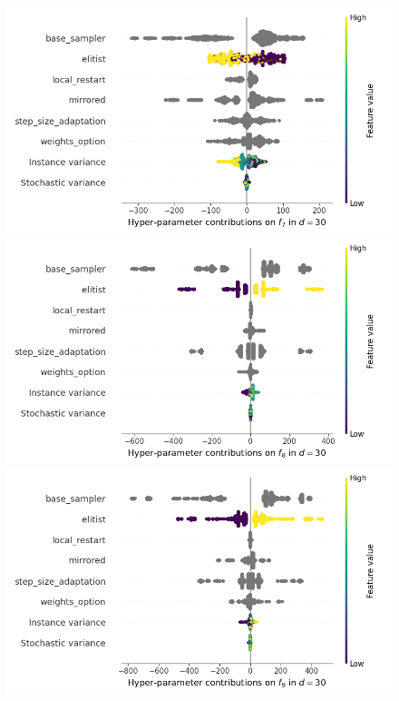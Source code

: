 \begin{figure}[t]
	\includegraphics[height=0.15\textheight,trim=60mm 0mm 30mm 0mm,clip]{images/img_summary_f7_d30.png}
	\includegraphics[height=0.15\textheight,trim=60mm 0mm 0mm 0mm,clip]{images/img_summary_f8_d30.png}
	\includegraphics[height=0.15\textheight,trim=0mm 0mm 30mm 0mm,clip]{images/img_summary_f9_d30.png}

\end{figure}

